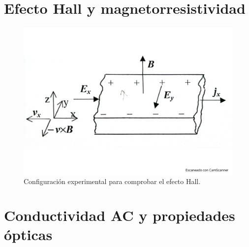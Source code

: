 \section{Efecto Hall y magnetorresistividad}
\begin{figure}[h!] \centering
    \includegraphics[scale=0.5]{Cuerpo/Ch_06/Fotos libro 7.pdf}
    \caption{Configuración experimental para comprobar el efecto Hall.}
    \label{Fig:06-07}
\end{figure}  


\section{Conductividad AC y propiedades ópticas}
